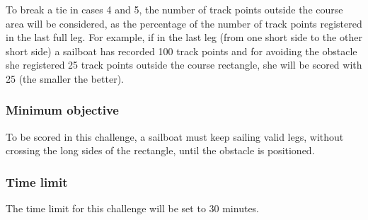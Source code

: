\documentclass[12pt]{article}
\begin{document}
To break a tie in cases 4 and 5, the number of track points outside the course
area will be
considered, as the percentage of the number of track points registered in the
last full leg. For
example, if in the last leg (from one short side to the other short side) a
sailboat has recorded
100 track points and for avoiding the obstacle she registered 25 track points
outside the
course rectangle, she will be scored with 25 (the smaller the better).

\subsubsection{Minimum objective}
To be scored in this challenge, a sailboat must keep sailing valid legs, without
crossing the long
sides of the rectangle, until the obstacle is positioned.

\subsubsection{Time limit}
The time limit for this challenge will be set to 30 minutes.
\end{document}
